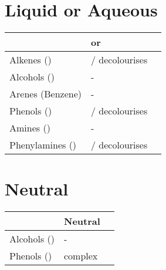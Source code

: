 	\pagebreak
	\section{Liquid or Aqueous }

		\vspace{1em}
		\begin{center}
		\begin{longtabu} to \textwidth {| X[c,m] | X[c,m] | N}

		\hline
							&	 or 						&\\[8mm]\hline

		Alkenes ()	&	  /   decolourises
		&\\[12mm] \hline

		Alcohols ()	&	-
		&\\[12mm] \hline

		Arenes (Benzene)	&	-
		&\\[12mm] \hline

		Phenols ()	&	  /   decolourises
		&\\[12mm] \hline

		Amines ()	&	-
		&\\[12mm] \hline

		Phenylamines ()&	  /   decolourises
		&\\[12mm] \hline

		\end{longtabu}
		\end{center}



	\section{Neutral }

		\vspace{1em}
		\begin{center}
		\begin{longtabu} to \textwidth {| X[c,m] | X[c,m] | N}

		\hline
							&	Neutral 		&\\[8mm]\hline

		Alcohols ()	&	-
		&\\[12mm] \hline

		Phenols ()	&	 complex
		&\\[12mm] \hline

		\end{longtabu}
		\end{center}

